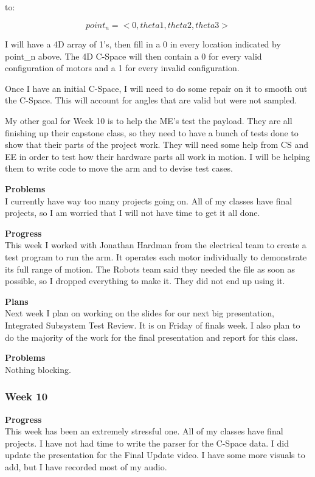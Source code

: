 to:

\[ point_n = <0, theta1, theta2, theta3> \]

I will have a 4D array of 1's, then fill in a 0 in every location indicated by point\_n above. The 4D C-Space will then contain a 0 for every valid configuration of motors and a 1 for every invalid configuration.

Once I have an initial C-Space, I will need to do some repair on it to smooth out the C-Space. This will account for angles that are valid but were not sampled.

My other goal for Week 10 is to help the ME's test the payload. They are all finishing up their capstone class, so they need to have a bunch of tests done to show that their parts of the project work. They will need some help from CS and EE in order to test how their hardware parts all work in motion. I will be helping them to write code to move the arm and to devise test cases.


\textbf{Problems} \\ 
I currently have way too many projects going on. All of my classes have final projects, so I am worried that I will not have time to get it all done.

\textbf{Progress} \\
This week I worked with Jonathan Hardman from the electrical team to create a 
test program to run the arm. It operates each motor individually to 
demonstrate its full range of motion. The Robots team said they needed the 
file as soon as possible, so I dropped everything to make it. They did not end
up using it.

\textbf{Plans} \\
Next week I plan on working on the slides for our next big presentation, 
Integrated Subsystem Test Review. It is on Friday of finals week. I also plan 
to do the majority of the work for the final presentation and report for this 
class.

\textbf{Problems} \\
Nothing blocking.

\subsubsection{Week 10}
\textbf{Progress} \\ 
This week has been an extremely stressful one. All of my classes have final projects. I have not had time to write the parser for the C-Space data. I did update the presentation for the Final Update video. I have some more visuals to add, but I have recorded most of my audio.


